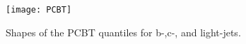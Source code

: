 \begin{figure}[!htbp]
  \centering
  \texttt{[image: PCBT]}
  \caption[Shapes of the pseudo-continuous b-tagging quantiles for different jet
  flavours.]{Shapes of the PCBT quantiles for b-,c-, and light-jets.}
  \label{fig:PCBT_quant}
\end{figure}
